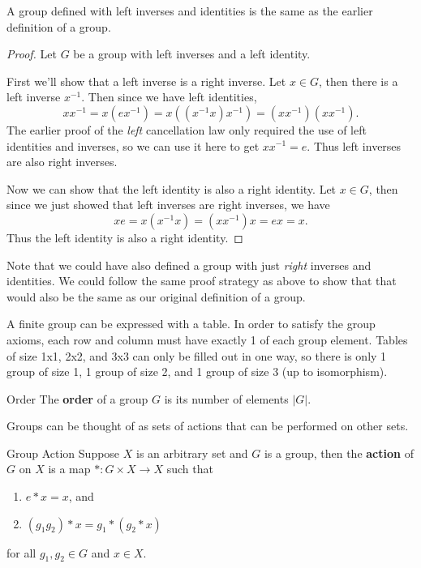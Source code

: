 \documentclass[10pt]{report}
\begin{document}
\begin{prop}
	A group defined with left inverses and identities is the same as the earlier definition of a group.
\end{prop}
\begin{proof}
	Let $G$ be a group with left inverses and a left identity.

	First we'll show that a left inverse is a right inverse. Let $x \in G$, then there is a left inverse $x^{-1}$. Then since we have left identities,
	\[
		x x^{-1} = x (e x^{-1}) = x ( (x^{-1} x) x^{-1}) = (x x^{-1}) (x x^{-1}).
	\] 
	The earlier proof of the \textit{left} cancellation law only required the use of left identities and inverses, so we can use it here to get $x x^{-1} = e.$ Thus left inverses are also right inverses.

	Now we can show that the left identity is also a right identity. Let $x \in G$, then since we just showed that left inverses are right inverses, we have
	\[
		x e = x (x^{-1} x) = (x x^{-1}) x = e x = x.
	\] Thus the left identity is also a right identity.
\end{proof}

Note that we could have also defined a group with just \textit{right} inverses and identities. We could follow the same proof strategy as above to show that that would also be the same as our original definition of a group.

\begin{note}{}{}
A finite group can be expressed with a table. In order to satisfy the group axioms, each row and column must have exactly 1 of each group element. Tables of size 1x1, 2x2, and 3x3 can only be filled out in one way, so there is only 1 group of size 1, 1 group of size 2, and 1 group of size 3 (up to isomorphism).
\end{note}

\begin{defn}{Order}{}
The \textbf{order} of a group $G$ is its number of elements $|G|$.
\end{defn}

Groups can be thought of as sets of actions that can be performed on other sets.

\begin{defn}{Group Action}{}
Suppose $X$ is an arbitrary set and $G$ is a group, then the \textbf{action} of $G$ on $X$ is a map $*:G\times X\to X$ such that
\begin{enumerate}
	\item $e*x=x$, and
	\item $(g_1g_2) * x = g_1*(g_2 *x)$
\end{enumerate}
for all $g_1,g_2 \in G$ and $x \in X$.
\end{defn}
\end{document}
